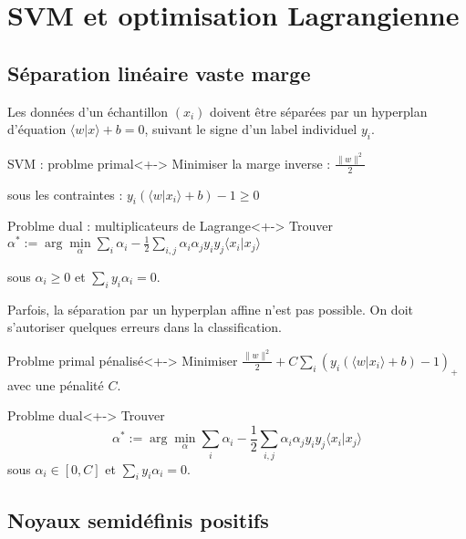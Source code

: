 \section{SVM et optimisation Lagrangienne}

\subsection{S\'eparation lin\'eaire  vaste marge}

\begin{frame}
Les donn\'ees d'un \'echantillon $(x_i)$ doivent \^etre s\'epar\'ees par un hyperplan d'\'equation $\langle w|x\rangle+b=0$, %
suivant le signe d'un label individuel $y_i$.

\pause
\begin{block}{SVM : problme primal}<+->
Minimiser la marge inverse :
$\frac{\|w\|^2}{2}$

sous les contraintes : $y_i(\langle w|x_i\rangle+b) -1\geq 0$
\end{block}
\begin{block}{Problme dual : multiplicateurs de Lagrange}<+->
Trouver $\alpha^{\ast}:=\arg\min\limits_{\alpha}\sum\limits_i\alpha_i-\frac{1}{2}\sum\limits_{i,j}\alpha_i\alpha_jy_iy_j\langle x_i|x_j\rangle$

sous $\alpha_i\geq 0$ et $\sum\limits_i y_i\alpha_i=0$.
\end{block}
\end{frame}

\begin{frame}
Parfois, la s\'eparation par un hyperplan affine n'est pas possible. On doit s'autoriser quelques erreurs dans la classification.

\pause
\begin{block}{Problme primal p\'enalis\'e}<+->
Minimiser $\frac{\|w\|^2}{2}+C\sum\limits_i(y_i(\langle w|x_i\rangle +b)-1)_+$
avec une p\'enalit\'e $C$.%
\end{block}
\begin{block}{Problme dual}<+->
Trouver
\[\alpha^{\ast}:=\arg\min\limits_{\alpha}\sum\limits_i\alpha_i-\frac{1}{2}\sum\limits_{i,j}\alpha_i\alpha_jy_iy_j\langle x_i|x_j\rangle\]
sous
$\alpha_i\in [0,C]$ et $\sum\limits_i y_i\alpha_i=0$.
\end{block}
\end{frame}

\subsection{Noyaux semid\'efinis positifs}


